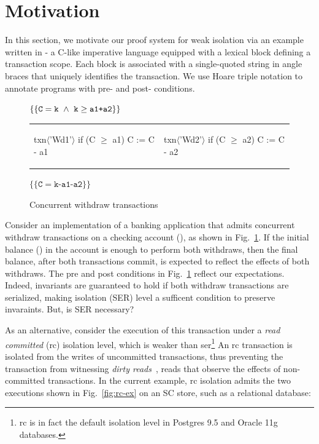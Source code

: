 \section{Motivation}

In this section, we motivate our proof system for weak isolation via
an example written in \txnimp - a C-like imperative language equipped
with a  lexical block defining a transaction scope. Each
 block is associated with a single-quoted string in angle
braces that uniquely identifies the transaction. We use Hoare triple
notation to annotate programs with pre- and post- conditions.

\begin{figure}
\centering
$\{\{\texttt{C}=\texttt{k} ~\wedge~ \texttt{k}\ge\texttt{a1+a2}\}\}$
\begin{tabular}{l||l}
\begin{txnimpcode}
  txn$\langle$'Wd1'$\rangle${
    if (C $\ge$ a1) {
      C := C - a1
    }
  }
\end{txnimpcode}
&
\begin{txnimpcode}
  txn$\langle$'Wd2'$\rangle${
    if (C $\ge$ a2) {
      C := C - a2
    }
  }
\end{txnimpcode}
\\
\end{tabular}
$\{\{\texttt{C}=\texttt{k-a1-a2}\}\}$

\caption{Concurrent withdraw transactions}
\label{fig:motiv-eg-1}
\end{figure}

Consider an implementation of a banking application that admits
concurrent withdraw transactions on a checking account (), as
shown in Fig.~\ref{fig:motiv-eg-1}. If the initial balance () in
the account is enough to perform both withdraws, then the final
balance, after both transactions commit, is expected to reflect the
effects of both withdraws. The pre and post conditions in
Fig.~\ref{fig:motiv-eg-1} reflect our expectations. Indeed, invariants
are guaranteed to hold if both withdraw transactions are serialized,
making  isolation (SER) level a sufficent condition
to preserve invaraints. But, is SER necessary?

As an alternative, consider the execution of this transaction under a
\emph{read committed} ({\sc rc}) isolation level, which is weaker than
{\sc ser}\footnote{{\sc rc} is in fact the default isolation level in
Postgres 9.5 and Oracle 11g databases.} An {\sc rc} transaction is
isolated from the writes of uncommitted transactions, thus preventing
the transaction from witnessing \emph{dirty reads}~\cite{berenson},
reads that observe the effects of non-committed transactions. In the
current example, {\sc rc} isolation admits the two executions shown in
Fig.~\ref{fig:rc-ex} on an SC store, such as a relational database:

